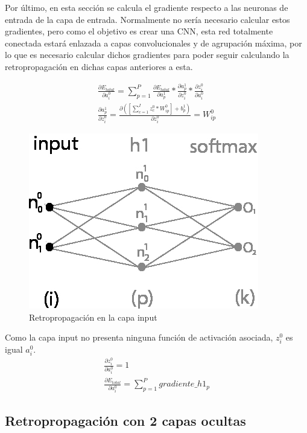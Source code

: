 Por último, en esta sección se calcula el gradiente respecto a las neuronas de entrada de la capa de entrada. Normalmente no sería necesario calcular estos gradientes, pero como el objetivo es crear una CNN, esta red totalmente conectada estará enlazada a capas convolucionales y de agrupación máxima, por lo que es necesario calcular dichos gradientes para poder seguir calculando la retropropagación en dichas capas anteriores a esta.

\begin{gather}
	\frac{\partial E_{total}}{\partial a^0_i} = \sum_{p=1}^P \frac{\partial E_{total}}{\partial a^1_p} * \frac{\partial a^1_p}{\partial z^0_i} * \frac{\partial z^0_i}{\partial a^0_i} \label{grad_a_1} \\
	\frac{\partial a^1_p }{\partial z^0_i } = \frac{\partial ([\sum_{c=1}^{I} z^0_c * W^0_{ip}] + b^1_p) }{\partial z^0_i } = W^0_{ip} \label{grad_a_2}
\end{gather}

\begin{figure}[H]
	\centering
	\includegraphics[scale=0.35]{imagenes/nn_1_capa_input.jpg}  
	\caption{Retropropagación en la capa input}
	\label{fig:nn_1_capa_input}
\end{figure}

Como la capa input no presenta ninguna función de activación asociada, $z^0_i$ es igual $a^0_i$. \\

\begin{gather}
	\frac{\partial z^0_i }{\partial a^0_i } = 1 \\
	\frac{\partial E_{total}}{\partial a^0_i} = \sum_{p=1}^{P} gradiente\_h1_p
\end{gather}

\subsection{Retropropagación con 2 capas ocultas}

